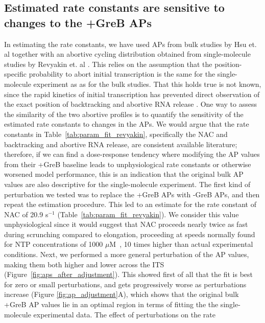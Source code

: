 \subsection{Estimated rate constants are sensitive to changes to the +GreB 
APs}
In estimating the rate constants, we have used APs from bulk studies by Hsu
et. al \cite{hsu_initial_2006} together with an abortive cycling distribution
obtained from single-molecule studies by Revyakin et. al
\cite{revyakin_abortive_2006}. This relies on the assumption that the
position-specific probability to abort initial transcription is the same for
the single-molecule experiment as as for the bulk studies. That this holds
true is not known, since the rapid kinetics of initial transcription
has prevented direct observation of the exact position of backtracking and abortive
RNA release \cite{margeat_direct_2006, revyakin_abortive_2006}. One way to
assess the similarity of the two abortive profiles is to quantify the
sensitivity of the estimated rate constants to changes in the APs. We would
argue that the rate constants in Table~\ref{tab:param_fit_revyakin},
specifically the NAC and backtracking and abortive RNA release, are consistent
available literature; therefore, if we can find a dose-response tendency
where modifying the AP values from their +GreB baseline leads to
unphysiological rate constants or otherwise worsened model performance, this
is an indication that the original bulk AP values are also descriptive for the
single-molecule experiment. The first kind of perturbation we tested was to
replace the +GreB APs with -GreB APs, and then repeat the estimation
procedure. This led to an estimate for the rate constant of NAC of 20.9
s$^{-1}$ (Table~\ref{tab:param_fit_revyakin}). We consider this value
unphysiological since it would suggest that NAC proceeds nearly twice as fast during
scrunching compared to elongation, proceeding at speeds normally found for NTP
concentrations of 1000 $\mu$M~\cite{bai_mechanochemical_2007}, 10 times higher
than actual experimental conditions. Next, we performed a more general
perturbation of the AP values, making them both higher and lower across the
ITS (Figure~\ref{fig:aps_after_adjustment}). This showed first of all that the fit is
best for zero or small perturbations, and gets progressively worse as
perturbations increase (Figure \ref{fig:ap_adjustment}A), which shows that the
original bulk +GreB AP values lie in an optimal region in terms of fitting the
the single-molecule experimental data. The effect of perturbations on the rate
